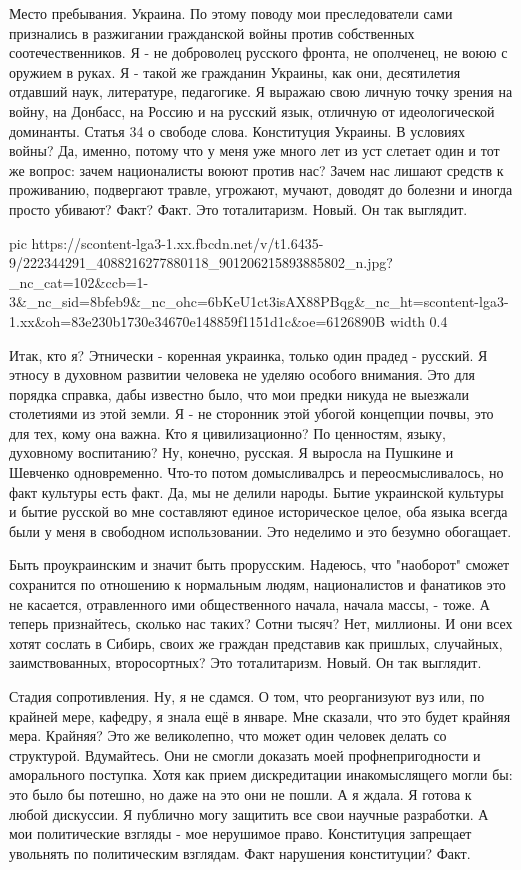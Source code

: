 Место пребывания. Украина. По этому поводу мои преследователи сами признались в
разжигании гражданской войны против собственных соотечественников. Я - не
доброволец русского фронта, не ополченец, не воюю с оружием в руках. Я - такой
же гражданин Украины, как они, десятилетия отдавший наук, литературе,
педагогике. Я выражаю свою личную точку зрения на войну, на Донбасс, на Россию
и на русский язык, отличную от идеологической доминанты. Статья 34 о свободе
слова. Конституция Украины. В условиях войны? Да, именно, потому что у меня уже
много лет из уст слетает один и тот же вопрос: зачем националисты воюют против
нас? Зачем нас лишают средств к проживанию, подвергают травле, угрожают,
мучают, доводят до болезни и иногда просто убивают? Факт? Факт. Это
тоталитаризм. Новый. Он так выглядит.

\ifcmt
  pic https://scontent-lga3-1.xx.fbcdn.net/v/t1.6435-9/222344291_4088216277880118_901206215893885802_n.jpg?_nc_cat=102&ccb=1-3&_nc_sid=8bfeb9&_nc_ohc=6bKeU1ct3isAX88PBqg&_nc_ht=scontent-lga3-1.xx&oh=83e230b1730e34670e148859f1151d1c&oe=6126890B
  width 0.4
\fi

Итак, кто я? Этнически - коренная украинка, только один прадед - русский. Я
этносу в духовном развитии человека не уделяю особого внимания. Это для порядка
справка, дабы известно было, что мои предки никуда не выезжали столетиями из
этой земли. Я - не сторонник этой убогой концепции почвы, это для тех, кому она
важна. Кто я цивилизационно? По ценностям, языку, духовному воспитанию? Ну,
конечно, русская. Я выросла на Пушкине и Шевченко одновременно. Что-то потом
домысливалрсь и переосмысливалось, но факт культуры есть факт. Да, мы не делили
народы. Бытие украинской культуры и бытие русской во мне составляют единое
историческое целое, оба языка всегда были у меня в свободном использовании. Это
неделимо и это безумно обогащает. 

Быть проукраинским и значит быть прорусским. Надеюсь, что "наоборот" сможет
сохранится по отношению к нормальным людям, националистов и фанатиков это не
касается, отравленного ими общественного начала, начала массы, - тоже. А теперь
признайтесь, сколько нас таких? Сотни тысяч? Нет, миллионы. И они всех хотят
сослать в Сибирь, своих же граждан представив как пришлых, случайных,
заимствованных, второсортных? Это тоталитаризм. Новый. Он так выглядит.

Стадия сопротивления. Ну, я не сдамся. О том, что реорганизуют вуз или, по
крайней мере, кафедру, я знала ещё в январе. Мне сказали, что это будет крайняя
мера. Крайняя? Это же великолепно, что может один человек делать со структурой.
Вдумайтесь. Они не смогли доказать моей профнепригодности и аморального
поступка. Хотя как прием дискредитации инакомыслящего могли бы: это было бы
потешно, но даже на это они не пошли. А я ждала. Я готова к любой дискуссии. Я
публично могу защитить все свои научные разработки. А мои политические взгляды
- мое нерушимое право. Конституция запрещает увольнять по политическим
взглядам. Факт нарушения конституции? Факт.

